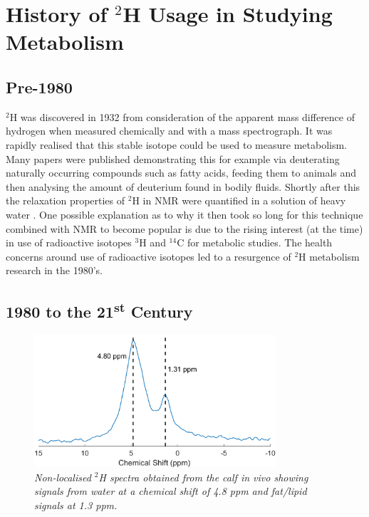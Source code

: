 \section{History of $^2$H Usage in Studying Metabolism}

\subsection{Pre-1980}

$^2$H was discovered in 1932 \cite{Urey1932AConcentration} from consideration of the apparent mass difference of hydrogen when measured chemically and with a mass spectrograph. It was rapidly realised that this stable isotope could be used to measure metabolism. Many papers were published demonstrating this \cite{Schoenheimer1935DeuteriumMetabolism,Schoenheimer1938TheMetabolism} for example via deuterating naturally occurring compounds such as fatty acids, feeding them to animals and then analysing the amount of deuterium found in bodily fluids. Shortly after this the relaxation properties of $^2$H in \ac{NMR} were quantified in a solution of heavy water \cite{Bloembergen1948RelaxationAbsorption}. One possible explanation as to why it then took so long for this technique combined with \ac{NMR} to become popular is due to the rising interest (at the time) \cite{DeFeyter2021DeuteriumFuture} in use of radioactive isotopes $^3$H \cite{Thompson1953StudiesRat} and $^{14}$C \cite{Turteltaub1990AcceleratorDNA.} for metabolic studies. The health concerns around use of radioactive isotopes led to a resurgence of $^2$H metabolism research in the 1980's.

\subsection{1980 to the 21\textsuperscript{st} Century}


\begin{figure}
    \centering
    \includegraphics[width=0.8\textwidth]{Figures/Intro/NA_Spectra.png}
    \caption{\textit{Non-localised $^2$H spectra obtained from the calf \textit{in vivo} showing signals from water at a chemical shift of 4.8 ppm and fat/lipid signals at 1.3 ppm.}}
    \label{fig:intro:NA}
\end{figure}

